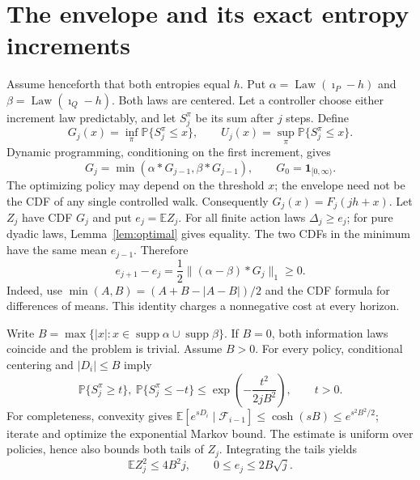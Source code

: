 \documentclass[11pt,a4paper]{article}
\numberwithin{equation}{section}
\newcommand{\E}{\mathbb E}
\newcommand{\Prb}{\mathbb P}
\newcommand{\Law}{\operatorname{Law}}
\newcommand{\ii}{\imath}
\begin{document}
\section{The envelope and its exact entropy increments}
Assume henceforth that both entropies equal $h$. Put
$\alpha=\Law(\ii_P-h)$ and $\beta=\Law(\ii_Q-h)$.
Both laws are centered. Let a controller choose either increment law
predictably, and let $S_j^\pi$ be its sum after $j$ steps. Define
\[
G_j(x)=\inf_\pi\Prb\{S_j^\pi\le x\},\qquad
U_j(x)=\sup_\pi\Prb\{S_j^\pi\le x\}.
\]
Dynamic programming, conditioning on the first increment, gives
\[
G_j=\min(\alpha*G_{j-1},\beta*G_{j-1}),\qquad
G_0=\mathbf1_{[0,\infty)}.
\]
The optimizing policy may depend on the threshold $x$; the envelope
need not be the CDF of any single controlled walk.
Consequently $G_j(x)=F_j(jh+x)$.
Let $Z_j$ have CDF $G_j$ and put $e_j=\E Z_j$.
For all finite action laws $\Delta_j\ge e_j$; for pure dyadic laws,
Lemma~\ref{lem:optimal} gives equality.
The two CDFs in the minimum have the same mean $e_{j-1}$. Therefore
\begin{equation}\label{eq:increments}
e_{j+1}-e_j=\frac12\| (\alpha-\beta)*G_j\|_1\ge0.
\end{equation}
Indeed, use $\min(A,B)=(A+B-|A-B|)/2$ and the CDF formula for differences
of means. This identity charges a nonnegative cost at every horizon.

Write $B=\max\{|x|:x\in\operatorname{supp}\alpha\cup
\operatorname{supp}\beta\}$. If $B=0$, both information laws coincide
and the problem is trivial. Assume $B>0$. For every policy, conditional
centering and $|D_i|\le B$ imply
\[
\Prb\{S_j^\pi\ge t\},\ \Prb\{S_j^\pi\le-t\}
\le\exp\left(-\frac{t^2}{2jB^2}\right),\qquad t>0.
\]
For completeness, convexity gives
$\E[e^{sD_i}\mid\mathcal F_{i-1}]\le\cosh(sB)\le e^{s^2B^2/2}$;
iterate and optimize the exponential Markov bound.
The estimate is uniform over policies, hence also bounds both tails of
$Z_j$. Integrating the tails yields
\begin{equation}\label{eq:second}
\E Z_j^2\le4B^2j,\qquad 0\le e_j\le2B\sqrt j.
\end{equation}
\end{document}
